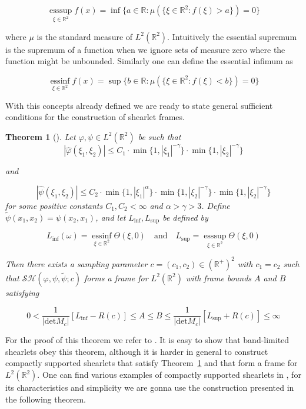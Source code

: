 \documentclass[a4paper]{article}
\newtheorem{theorem}{Theorem}
\begin{document}
$$
\underset{\xi\in\mathbb{R}^2}{\text{ess}\sup}f(x)=\inf\{a\in\mathbb{R}:\mu(\{\xi\in\mathbb{R}^2: f(\xi)>a\})=0\}
$$

where $\mu$ is the standard measure of $L^2(\mathbb{R}^2)$. Intuitively the essential supremum is the supremum of a function when we ignore sets of measure zero where the function might be unbounded. Similarly one can define the essential infimum as

$$
\underset{\xi\in\mathbb{R}^2}{\text{ess}\inf}f(x)=\sup\{b\in\mathbb{R}:\mu(\{\xi\in\mathbb{R}^2: f(\xi)<b\})=0\}
$$

\bigskip

With this concepts already defined we are ready to state general sufficient conditions for the construction of shearlet frames.

\bigskip

\begin{theorem}[\cite{ConstructCompactShear}]
\label{thm:suff_shear_frame}
Let $\varphi,\psi\in L^2(\mathbb{R}^2)$ be such that
$$
|\hat{\varphi}(\xi_1,\xi_2)|\leq C_1\cdot\min\{1,|\xi_1|^{-\gamma}\}\cdot\min\{1,|\xi_2|^{-\gamma}\}
$$

and

$$
|\hat{\psi}(\xi_1,\xi_2)|\leq C_2\cdot\min\{1,|\xi_1|^{\alpha}\}\cdot\min\{1,|\xi_2|^{-\gamma}\}\cdot \min\{1,|\xi_2|^{-\gamma}\}
$$
for some positive constants $C_1,C_2<\infty$ and $\alpha>\gamma>3$. Define $\tilde{\psi}(x_1,x_2)=\psi(x_2,x_1)$, and let $L_{\inf},L_{\sup}$ be defined by

$$
L_{\inf}(\omega)=\underset{\xi\in\mathbb{R}^2}{\text{ess}\inf}\Theta(\xi,0) \quad \text{and} \quad L_{\sup}=\underset{\xi\in\mathbb{R}^2}{\text{ess}\sup}\Theta(\xi,0)
$$

Then there exists a sampling parameter $c=(c_1,c_2)\in(\mathbb{R}^+)^2$ with $c_1=c_2$ such that $\mathcal{SH}(\varphi,\psi,\tilde{\psi};c)$ forms a frame for $L^2(\mathbb{R}^2)$ with frame bounds $A$ and $B$ satisfying

$$
0<\frac{1}{|\text{det}M_c|}[L_{\inf}-R(c)]\leq A\leq B \leq \frac{1}{|\text{det}M_c|}[L_{\sup}+R(c)]\leq \infty
$$
\end{theorem}

\bigskip

For the proof of this theorem we refer to \cite{ConstructCompactShear}. It is easy to show that band-limited shearlets obey this theorem, although it is harder in general to construct compactly supported shearlets that satisfy Theorem~\ref{thm:suff_shear_frame} and that form a frame for $L^2(\mathbb{R}^2)$. One can find various examples of compactly supported shearlets in \cite{ConstructCompactShear}, for its characteristics and simplicity we are gonna use the construction presented in the following theorem.
\end{document}
